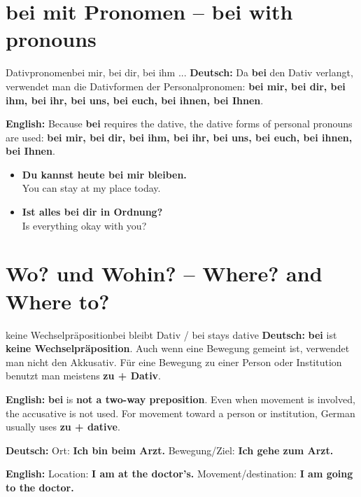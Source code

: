 \documentclass[a4paper,11pt]{article}
\newcommand{\GermanText}[1]{\textbf{Deutsch: }#1\par}
\newcommand{\EnglishText}[1]{{\small\color{SoftGray}\textbf{English: }#1\par}}
\newcommand{\ExampleItem}[2]{\item \textbf{#1}\\{\small\color{SoftGray}#2}}
\begin{document}
   \section{bei mit Pronomen -- bei with pronouns}
                              \begin{grammarentry}{Dativpronomen}{bei mir, bei dir, bei ihm ...}
                                 \GermanText{Da \textbf{bei} den Dativ verlangt, verwendet man die Dativformen der Personalpronomen: \textbf{bei mir, bei dir, bei ihm, bei ihr, bei uns, bei euch, bei ihnen, bei Ihnen}.}
                                 \EnglishText{Because \textbf{bei} requires the dative, the dative forms of personal pronouns are used: \textbf{bei mir, bei dir, bei ihm, bei ihr, bei uns, bei euch, bei ihnen, bei Ihnen}.}
                              \end{grammarentry}
                              \begin{exbox}\begin{itemize}
                                 \ExampleItem{Du kannst heute bei mir bleiben.}{You can stay at my place today.}
                                 \ExampleItem{Ist alles bei dir in Ordnung?}{Is everything okay with you?}
                                 \end{itemize}\end{exbox}

   \section{Wo? und Wohin? -- Where? and Where to?}
                                 \begin{grammarentry}{keine Wechselpräposition}{bei bleibt Dativ / bei stays dative}
                                    \GermanText{\textbf{bei} ist \textbf{keine Wechselpräposition}. Auch wenn eine Bewegung gemeint ist, verwendet man nicht den Akkusativ. Für eine Bewegung zu einer Person oder Institution benutzt man meistens \textbf{zu + Dativ}.}
                                    \EnglishText{\textbf{bei} is \textbf{not a two-way preposition}. Even when movement is involved, the accusative is not used. For movement toward a person or institution, German usually uses \textbf{zu + dative}.}
                                    \GermanText{Ort: \textbf{Ich bin beim Arzt.} Bewegung/Ziel: \textbf{Ich gehe zum Arzt.}}
                                    \EnglishText{Location: \textbf{I am at the doctor's.} Movement/destination: \textbf{I am going to the doctor.}}
                                 \end{grammarentry}
\end{document}

